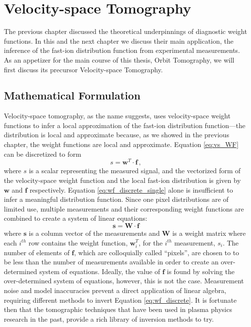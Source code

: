 \chapter{Velocity-space Tomography}\label{chap:velocity-space_tomography}

The previous chapter discussed the theoretical underpinnings of diagnostic weight functions. In this and the next chapter we discuss their main application, the inference of the fast-ion distribution function from experimental measurements. As an appetizer for the main course of this thesis, Orbit Tomography, we will first discuss its precursor Velocity-space Tomography.

\section{Mathematical Formulation}
Velocity-space tomography, as the name suggests, uses velocity-space weight functions to infer a local approximation of the fast-ion distribution function---the distribution is local and approximate because, as we showed in the previous chapter, the weight functions are local and approximate.
Equation \ref{eq:vs_WF} can be discretized to form
\begin{equation} \label{eq:wf_discrete_single}
    s = \mathbf{w}^T \cdot \mathbf{f}\,,
\end{equation}
where $s$ is a scalar representing the measured signal, and the vectorized form of the velocity-space weight function and the local fast-ion distribution is given by $\mathbf{w}$ and $\mathbf{f}$ respectively. Equation \ref{eq:wf_discrete_single} alone is insufficient to infer a meaningful distribution function.
Since one pixel distributions are of limited use, multiple measurements and their corresponding weight functions are combined to create a system of linear equations:
\begin{equation}\label{eq:wf_discrete}
    \mathbf{s} = \mathbf{W}\cdot\mathbf{f}
\end{equation}
where $\mathbf{s}$ is a column vector of the measurements and $\mathbf{W}$ is a weight matrix where each $i^{th}$ row contains the weight function, $\mathbf{w}_i^T$, for the $i^{th}$ measurement, $s_i$. 
The number of elements of $\mathbf{f}$, which are colloquially called ``pixels'', are chosen to to be less than the number of measurements available in order to create an over-determined system of equations. 
Ideally, the value of $\mathbf{f}$ is found by solving the over-determined system of equations, however, this is not the case. Measurement noise and model inaccuracies prevent a direct application of linear algebra, requiring different methods to invert Equation \ref{eq:wf_discrete}. It is fortunate then that the tomographic techniques that have been used in plasma physics research in the past, provide a rich library of inversion methods to try.\cite{nagayama1981soft,koslover1986measurement,mcwilliams1987laboratory,reinhold1990excitation,Anton1996,zimmerman2005two,svensson2008current,odstrcil2012modern}

